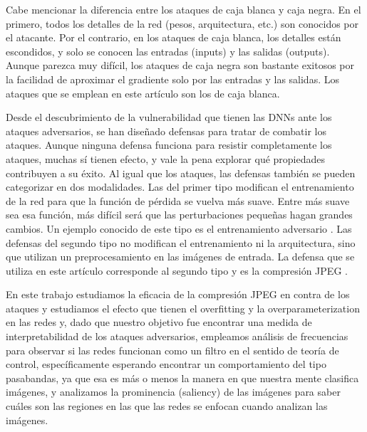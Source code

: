 Cabe mencionar la diferencia entre los ataques de caja blanca y caja negra. En el primero, todos los detalles de la red (pesos, arquitectura, etc.) son conocidos por el atacante. Por el contrario, en los ataques de caja blanca, los detalles están escondidos, y solo se conocen las entradas (inputs) y las salidas (outputs). Aunque parezca muy difícil, los ataques de caja negra son bastante exitosos por la facilidad de aproximar el gradiente solo por las entradas y las salidas. Los ataques que se emplean en este artículo son los de caja blanca.

Desde el descubrimiento de la vulnerabilidad que tienen las DNNs ante los ataques adversarios, se han diseñado defensas para tratar de combatir los ataques. Aunque ninguna defensa funciona para resistir completamente los ataques, muchas sí tienen efecto, y vale la pena explorar qué propiedades contribuyen a su éxito. Al igual que los ataques, las defensas también se pueden categorizar en dos modalidades. Las del primer tipo modifican el entrenamiento de la red para que la función de pérdida se vuelva más suave. Entre más suave sea esa función, más difícil será que las perturbaciones pequeñas hagan grandes cambios. Un ejemplo conocido de este tipo es el entrenamiento adversario \cite{goodfellow2015explaining, Shaham_2018, szegedy2014intriguing}. Las defensas del segundo tipo no modifican el entrenamiento ni la arquitectura, sino que utilizan un preprocesamiento en las imágenes de entrada. La defensa que se utiliza en este artículo corresponde al segundo tipo y es la compresión JPEG \cite{das2017keeping}.

En este trabajo estudiamos la eficacia de la compresión JPEG en contra de los ataques y estudiamos el efecto que tienen el overfitting y la overparameterization en las redes y, dado que nuestro objetivo fue encontrar una medida de interpretabilidad de los ataques adversarios, empleamos análisis de frecuencias para observar si las redes funcionan como un filtro en el sentido de teoría de control, específicamente esperando encontrar un comportamiento del tipo pasabandas, ya que esa es más o menos la manera en que nuestra mente clasifica imágenes, y analizamos la prominencia (saliency) \cite{simonyan2014deep} de las imágenes para saber cuáles son las regiones en las que las redes se enfocan cuando analizan las imágenes.